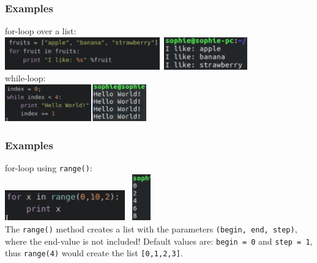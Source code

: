 \documentclass{beamer}
\begin{document}
\begin{frame}
\frametitle{Examples}
	
	for-loop over a list:\\
		\includegraphics[height = 1.4cm]{forLoop.pdf} $\,$\includegraphics[height = 1.4cm]{forLoop_Output.pdf}\\
	while-loop: \\
		\includegraphics[height = 1.6cm]{whileLoop.pdf}$\,$\includegraphics[height = 1.6cm]{whileLoop_Output.pdf}
	
\end{frame}
\begin{frame}
\frametitle{Examples}
	
	for-loop using \texttt{range()}:\\
		\includegraphics[height = 1.3cm]{forLoopRange.pdf} $\,$
		\includegraphics[height = 2cm]{forLoopRange_Output.pdf} \\
	The \texttt{range()} method creates a list with the parameters \texttt{(begin, end, step)}, where the end-value is not included! Default values are: \texttt{begin = 0} and \texttt{step = 1}, thus \texttt{range(4)} would create the list \texttt{[0,1,2,3]}.
		
	
\end{frame}
\end{document}
